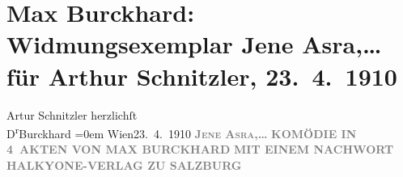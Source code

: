 

         
         \newcommand{\erwaehntePersonen}{Personen: }
         \newcommand{\erwaehnteInstitutionen}{Institutionen: Halkyone-Verlag, Österreichische Nationalbibliothek}
         \newcommand{\erwaehnteOrte}{Orte: Salzburg, Wien}
         \newcommand{\erwaehnteWerke}{Werke: Jene Asra,… Komödie in 4 Akten}
               \section[Max Burckhard: Widmungsexemplar Jene Asra,… für Arthur Schnitzler, 23. 4. 1910]{ Max Burckhard: Widmungsexemplar Jene Asra,…  für Arthur Schnitzler,
                    23. 4. 1910}\nopagebreak{}\rehead{ }\begin{ledgroupsized}[t]{13cm}\normalsize\beginnumbering \toendnotes[C]{\smallbreak\pagebreak[2]} 
\pstart
           \noindent{}\centering{}{\pb}Artur Schnitzler\pend
           \pstart
           \hspace*{2.5em}herzlichſt{\\[\baselineskip]}\spacefill\mbox{D\textsuperscript{r}Burckhard}\pend
           \leftskip=0em{}\pstart
           Wien23. 4. 1910\pend
           {\bigskip}\pstart
           \noindent{}\centering{}\textcolor{gray}{\textbf{\textsc{Jene Asra,…}}}\pend
           \pstart
           \noindent{}\centering{}\textcolor{gray}{\textbf{KOMÖDIE IN 4 AKTEN VON MAX BURCKHARD}}\pend
           {\bigskip}\pstart
           \noindent{}\centering{}\textcolor{gray}{\textbf{MIT EINEM NACHWORT}}\pend
           \pstart
           \noindent{}\centering{}\textcolor{gray}{\textbf{HALKYONE-VERLAG ZU SALZBURG}}\pend
           
         
         \endnumbering{}\end{ledgroupsized}  \newcommand{\dateiname}{L01927}\newcommand{\titel}{Max Burckhard: Widmungsexemplar Jene Asra,… für Arthur Schnitzler, 23. 4. 1910}\newcommand{\editorInnen}{Martin Anton Müller und Gerd-Hermann Susen}
      